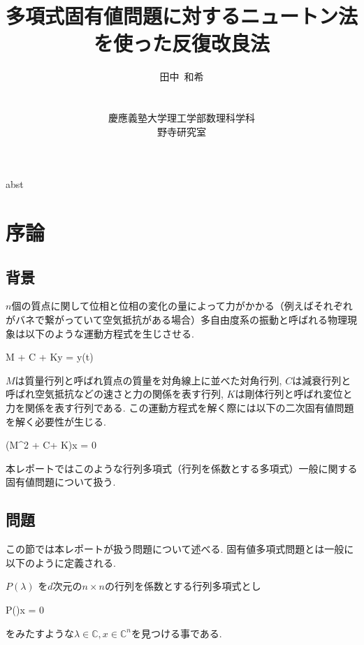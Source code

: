 \documentclass[a4paper,12pt]{nodlabpabw}
\newenvironment{Eqnarray*}%
{\arraycolsep 0.14em\begin{eqnarray*}}{\end{eqnarray*}}
\begin{document}
\title{多項式固有値問題に対するニュートン法を使った反復改良法}
\author{田中\ 和希\\\\\\慶應義塾大学理工学部数理科学科\\野寺研究室}
\date{}
\maketitle
\begin{tableofcontents}
\end{tableofcontents}
\abstract
abst
\endabstract
%
\chapter{序論}
\section{背景}\label{chapint}
$n$個の質点に関して位相と位相の変化の量によって力がかかる（例えばそれぞれがバネで繋がっていて空気抵抗がある場合）多自由度系の振動と呼ばれる物理現象は以下のような運動方程式を生じさせる.

\begin{Eqnarray*}
M + C + Ky = y(t)
\end{Eqnarray*}

$M$は質量行列と呼ばれ質点の質量を対角線上に並べた対角行列, $C$は減衰行列と呼ばれ空気抵抗などの速さと力の関係を表す行列, $K$は剛体行列と呼ばれ変位と力を関係を表す行列である. この運動方程式を解く際には以下の二次固有値問題を解く必要性が生じる.

\begin{Eqnarray*}
(M\lambda^2 + C\lambda + K)x = 0
\end{Eqnarray*}

本レポートではこのような行列多項式（行列を係数とする多項式）一般に関する固有値問題について扱う.

\section{問題}\label{chapint}

この節では本レポートが扱う問題について述べる. 固有値多項式問題とは一般に以下のように定義される.

$P(\lambda)$ を$d$次元の$n\times n$の行列を係数とする行列多項式とし

\begin{Eqnarray*}
P(\lambda)x = 0
\end{Eqnarray*}
をみたすような$\lambda\in\mathbb{C}, x\in\mathbb{C}^n$を見つける事である.
\end{document}
